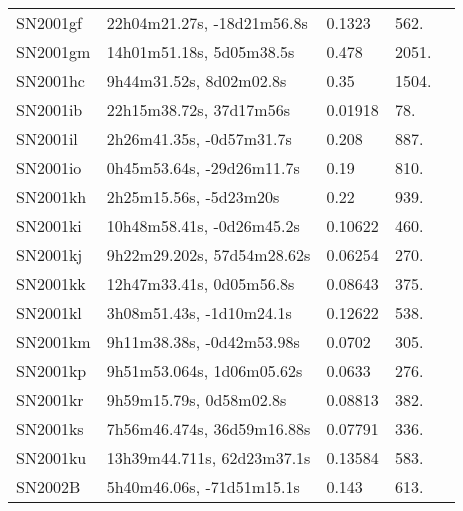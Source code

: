 \begin{longtable}{lllll}
         SN2001gf &     22h04m21.27s, -18d21m56.8s &   0.1323 &           562. &    \citet{20032dF...C...0000C} \\
         SN2001gm &       14h01m51.18s, 5d05m38.5s &    0.478 &          2051. &    \citet{2001IAUC.7763A...1S} \\
         SN2001hc &        9h44m31.52s, 8d02m02.8s &     0.35 &          1504. &    \citet{2001IAUC.7763A...1S} \\
         SN2001ib &        22h15m38.72s, 37d17m56s &  0.01918 &            78. &  \citet{1995AandAS..110...19D} \\
         SN2001il &       2h26m41.35s, -0d57m31.7s &    0.208 &           887. &    \citet{2002IAUC.7795A...1F} \\
         SN2001io &      0h45m53.64s, -29d26m11.7s &     0.19 &           810. &    \citet{2001IAUC.7780A...1A} \\
         SN2001kh &         2h25m15.56s, -5d23m20s &     0.22 &           939. &    \citet{2002IAUC.7957A...1E} \\
         SN2001ki &      10h48m58.41s, -0d26m45.2s &  0.10622 &           460. &    \citet{2003SDSS1.C...0000:} \\
         SN2001kj &     9h22m29.202s, 57d54m28.62s &  0.06254 &           270. &    \citet{2004SDSS2.C...0000:} \\
         SN2001kk &       12h47m33.41s, 0d05m56.8s &  0.08643 &           375. &    \citet{2003SDSS1.C...0000:} \\
         SN2001kl &       3h08m51.43s, -1d10m24.1s &  0.12622 &           538. &    \citet{2003SDSS1.C...0000:} \\
         SN2001km &      9h11m38.38s, -0d42m53.98s &   0.0702 &           305. &    \citet{2016SDSSD.C...0000:} \\
         SN2001kp &      9h51m53.064s, 1d06m05.62s &   0.0633 &           276. &    \citet{2004SDSS2.C...0000:} \\
         SN2001kr &        9h59m15.79s, 0d58m02.8s &  0.08813 &           382. &    \citet{2003SDSS1.C...0000:} \\
         SN2001ks &     7h56m46.474s, 36d59m16.88s &  0.07791 &           336. &    \citet{2004SDSS2.C...0000:} \\
         SN2001ku &     13h39m44.711s, 62d23m37.1s &  0.13584 &           583. &    \citet{2003SDSS1.C...0000:} \\
          SN2002B &      5h40m46.06s, -71d51m15.1s &    0.143 &           613. &    \citet{2002IAUC.7803C...1C} \\

\end{longtable}

